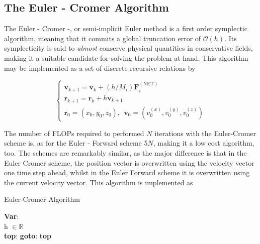 	
	\subsection{The Euler - Cromer Algorithm}
	The Euler - Cromer -, or semi-implicit Euler method is a first order symplectic algorithm, meaning that it commits a global truncation error of $\mathcal{O}(h)$. Its symplecticity is said to \textit{almost} conserve physical quantities in conservative fields, making it a suitable candidate for solving the problem at hand. This algorithm may be implemented as a set of discrete recursive relations by

		\begin{equation}
	\begin{cases}
	\mathbf{v}_{k+1} = \mathbf{v}_k + (h/M_i)\mathbf{F}^{(\text{NET})}_i\\
	\mathbf{r}_{k+1} = \mathbf{r}_k + h\mathbf{v}_{k+1}\\
	\mathbf{r}_0 = (x_0, y_0,z_0),\ \ \mathbf{v}_0 = (v^{(x)}_0, v^{(y)}_0,v^{(z)}_0)
	\end{cases}
	\label{eulercromer}
	\end{equation}
	
	The number of FLOPs required to performed $N$ iterations with the Euler-Cromer scheme is, as for the Euler - Forward scheme 5$N$, making it a low cost algorithm, too. The schemes are remarkably similar, as the major difference is that in the Euler Cromer scheme, the position vector is overwritten using the velocity vector one time step ahead, whilst in the Euler Forward scheme it is overwritten using the current velocity vector. This algorithm is implemented as\\
	
	\begin{algorithm}[H]
		\caption{Euler-Cromer Algorithm}
		\label{algoEC}
		\SetAlgoLined
		
		\textbf{Var}:\\
		h $\in \mathbb{R}$\\
		\textbf{top}:	
		\newline
	\textbf{goto}: \textbf{top}
	\end{algorithm}
	
